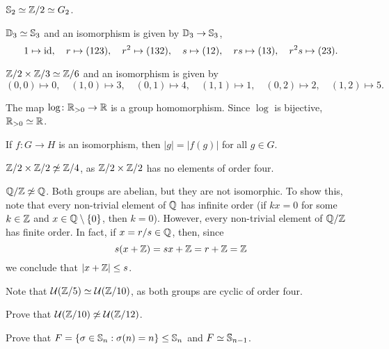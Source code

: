 \begin{example}
$\mathbb{S}_2\simeq\mathbb{Z}/2\simeq G_2$.
\end{example}

\begin{example}
$\mathbb{D}_3\simeq\mathbb{S}_3$ and an isomorphism is given by $\mathbb{D}_3\to\mathbb{S}_3$,
\[
1\mapsto \operatorname{id},\quad
r\mapsto (123),\quad r^2\mapsto(132),\quad s\mapsto(12),\quad rs\mapsto(13),\quad r^2s\mapsto(23).
\]
\end{example}

\begin{example}
$\mathbb{Z}/2\times\mathbb{Z}/3\simeq\mathbb{Z}/6$ and an isomorphism is given by 
\[
(0,0)\mapsto 0,\quad (1,0)\mapsto 3,\quad
(0,1)\mapsto 4,\quad (1,1)\mapsto 1,\quad (0,2)\mapsto 2,\quad (1,2)\mapsto 5.
\]
\end{example}

\begin{example}
The map $\log\colon\mathbb{R}_{>0}\to\mathbb{R}$ is a group homomorphism. Since
$\log$ is bijective, 
$\mathbb{R}_{>0}\simeq\mathbb{R}$.
\end{example}

If $f\colon G\to H$ is an isomorphism, then
$|g|=|f(g)|$ for all $g\in G$. 

\begin{example}
$\mathbb{Z}/2\times\mathbb{Z}/2\not\simeq\mathbb{Z}/4$, as $\mathbb{Z}/2\times\mathbb{Z}/2$ has no elements of order four. 
\end{example}

\begin{example}
$\mathbb{Q}/\mathbb{Z}\not\simeq\mathbb{Q}$. Both groups are abelian, but they are not isomorphic. To show this, note that every non-trivial element of $\mathbb{Q}$ has infinite order (if $kx=0$ for some $k\in\mathbb{Z}$ and $x\in\mathbb{Q}\setminus\{0\}$, then
$k=0$). However, every non-trivial element of $\mathbb{Q}/\mathbb{Z}$ has finite order. In fact, if $x=r/s\in\mathbb{Q}$, then, since 
\[
s(x+\mathbb{Z})=sx+\mathbb{Z}=r+\mathbb{Z}=\mathbb{Z}
\]
we conclude that $|x+\mathbb{Z}|\leq s$.
\end{example}

\begin{example}
Note that $\mathcal{U}(\mathbb{Z}/5)\simeq\mathcal{U}(\mathbb{Z}/10)$, as
both groups are cyclic of order four. 
\end{example}

\begin{exercise}
\label{xca:U(Z/10)}
   Prove that $\mathcal{U}(\mathbb{Z}/10)\not\simeq\mathcal{U}(\mathbb{Z}/12)$.
\end{exercise}

\begin{exercise}
Prove that $F=\{\sigma\in\mathbb{S}_n:\sigma(n)=n\}\leq\mathbb{S}_n$ and $F\simeq\mathbb{S}_{n-1}$.
\end{exercise}

